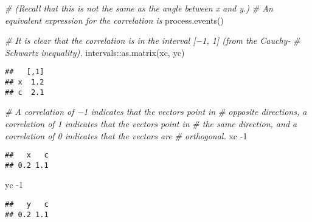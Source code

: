 \documentclass[
]{article}
\newenvironment{Shaded}{\begin{snugshade}}{\end{snugshade}}
\newcommand{\CommentTok}[1]{\textcolor[rgb]{0.56,0.35,0.01}{\textit{#1}}}
\newcommand{\DecValTok}[1]{\textcolor[rgb]{0.00,0.00,0.81}{#1}}
\newcommand{\FunctionTok}[1]{\textcolor[rgb]{0.00,0.00,0.00}{#1}}
\newcommand{\NormalTok}[1]{#1}
\newcommand{\SpecialCharTok}[1]{\textcolor[rgb]{0.00,0.00,0.00}{#1}}
\begin{document}
\begin{Shaded}
\begin{Highlighting}[]
\CommentTok{\# (Recall that this is not the same as the angle between x and y.)}
\CommentTok{\# An equivalent expression for the correlation is}
\FunctionTok{process.events}\NormalTok{()}

\CommentTok{\# It is clear that the correlation is in the interval [−1, 1] (from the Cauchy{-}}
\CommentTok{\# Schwartz inequality).}
\NormalTok{intervals}\SpecialCharTok{::}\FunctionTok{as.matrix}\NormalTok{(xc, yc)}
\end{Highlighting}
\end{Shaded}

\begin{verbatim}
##   [,1]
## x  1.2
## c  2.1
\end{verbatim}

\begin{Shaded}
\begin{Highlighting}[]
\CommentTok{\# A correlation of −1 indicates that the vectors point in}
\CommentTok{\# opposite directions, a correlation of 1 indicates that the vectors point in }
\CommentTok{\# the same direction, and a correlation of 0 indicates that the vectors are }
\CommentTok{\# orthogonal.}
\NormalTok{xc }\SpecialCharTok{{-}}\DecValTok{1}
\end{Highlighting}
\end{Shaded}

\begin{verbatim}
##   x   c 
## 0.2 1.1
\end{verbatim}

\begin{Shaded}
\begin{Highlighting}[]
\NormalTok{yc }\SpecialCharTok{{-}}\DecValTok{1}
\end{Highlighting}
\end{Shaded}

\begin{verbatim}
##   y   c 
## 0.2 1.1
\end{verbatim}
\end{document}
